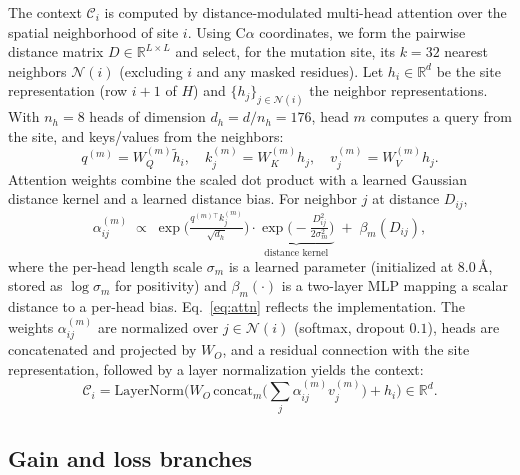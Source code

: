 \documentclass[11pt,a4paper]{article}
\theoremstyle{plain}
\theoremstyle{definition}
\begin{document}
The context $\mathcal{C}_i$ is computed by distance-modulated multi-head
attention over the spatial neighborhood of site $i$. Using $\mathrm{C}\alpha$
coordinates, we form the pairwise distance matrix $D \in \mathbb{R}^{L\times L}$
and select, for the mutation site, its $k = 32$ nearest neighbors
$\mathcal{N}(i)$ (excluding $i$ and any masked residues). Let
$h_i \in \mathbb{R}^{d}$ be the site representation (row $i+1$ of $H$) and
$\{h_j\}_{j\in\mathcal{N}(i)}$ the neighbor representations. With $n_h = 8$
heads of dimension $d_h = d / n_h = 176$, head $m$ computes a query from the
site, and keys/values from the neighbors:
\begin{equation}
q^{(m)} = W_Q^{(m)} \tilde{h}_i, \quad
k_j^{(m)} = W_K^{(m)} h_j, \quad
v_j^{(m)} = W_V^{(m)} h_j .
\end{equation}
Attention weights combine the scaled dot product with a learned Gaussian
distance kernel and a learned distance bias. For neighbor $j$ at distance
$D_{ij}$,
\begin{equation}
\alpha^{(m)}_{ij} \;\propto\; \exp\!\Big(\tfrac{q^{(m)\top} k_j^{(m)}}{\sqrt{d_h}}\Big)
\cdot \underbrace{\exp\!\Big(-\tfrac{D_{ij}^2}{2\sigma_m^2}\Big)}_{\text{distance kernel}}
\;+\; \beta_m(D_{ij}),
\label{eq:attn}
\end{equation}
where the per-head length scale $\sigma_m$ is a learned parameter
(initialized at $8.0$\,\AA, stored as $\log\sigma_m$ for positivity) and
$\beta_m(\cdot)$ is a two-layer MLP mapping a scalar distance to a per-head
bias. Eq.~\eqref{eq:attn} reflects the implementation. The weights $\alpha^{(m)}_{ij}$ are normalized over $j\in\mathcal{N}(i)$ (softmax, dropout $0.1$), heads are concatenated and projected by $W_O$, and a residual connection with the site representation, followed by a layer
normalization yields the context:
\begin{equation}
\mathcal{C}_i = \mathrm{LayerNorm}\!\Big( W_O \,\mathrm{concat}_m\big(\textstyle\sum_{j} \alpha^{(m)}_{ij} v_j^{(m)}\big) + h_i \Big) \in \mathbb{R}^{d}.
\end{equation}

\subsection{Gain and loss branches}
\label{sec:branches}
\end{document}

